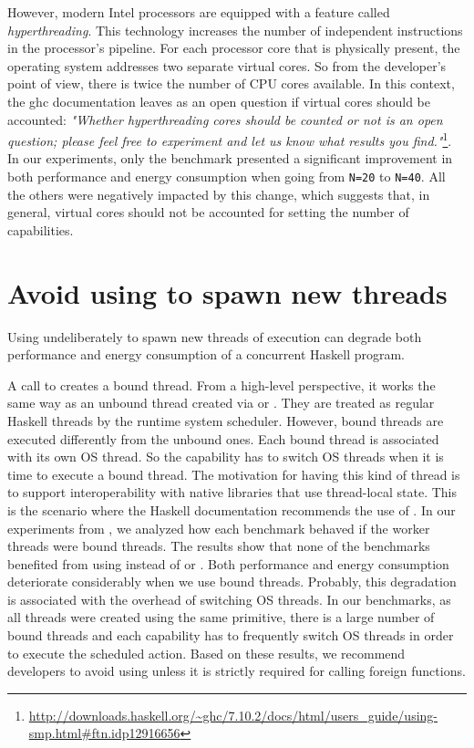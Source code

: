 However, modern Intel processors are equipped with a feature called \emph{hyperthreading}. This technology increases the number of independent instructions in the processor's pipeline. For each processor core that is physically present, the operating system addresses two separate virtual cores. So from the developer's point of view, there is twice the number of CPU cores available. In this context, the \ac{ghc} documentation leaves as an open question if virtual cores should be accounted: \emph{"Whether hyperthreading cores should be counted or not is an open question; please feel free to experiment and let us know what results you find."}\footnote{\url{http://downloads.haskell.org/~ghc/7.10.2/docs/html/users\_guide/using-smp.html\#ftn.idp12916656}}. In our experiments, only the \spectral benchmark presented a significant improvement in both performance and energy consumption when going from \texttt{N=20} to \texttt{N=40}. All the others were negatively impacted by this change, which suggests that, in general, virtual cores should not be accounted for setting the number of capabilities.


\section{Avoid using \forkOS to spawn new threads}
 Using \forkOS undeliberately to spawn new threads of execution can degrade both performance and energy consumption of a concurrent Haskell program.
\newline

 A call to \forkOS creates a bound thread. From a high-level perspective, it works the same way as an unbound thread created via \forkIO or \forkOn. They are treated as regular Haskell threads by the runtime system scheduler. However, bound threads are executed differently from the unbound ones. Each bound thread is associated with its own OS thread. So the capability has to switch OS threads when it is time to execute a bound thread. The motivation for having this kind of thread is to support interoperability with native libraries that use thread-local state. This is the scenario where the Haskell documentation recommends the use of \forkOS. In our experiments from , we analyzed how each benchmark behaved if the worker threads were bound threads. The results show that none of the benchmarks benefited from using \forkOS instead of \forkIO or \forkOn. Both performance and energy consumption deteriorate considerably when we use bound threads. Probably, this degradation is associated with the overhead of switching OS threads. In our benchmarks, as all threads were created using the same primitive, there is a large number of bound threads and each capability has to frequently switch OS threads in order to execute the scheduled action. Based on these results, we recommend developers to avoid using \forkOS unless it is strictly required for calling foreign functions.

